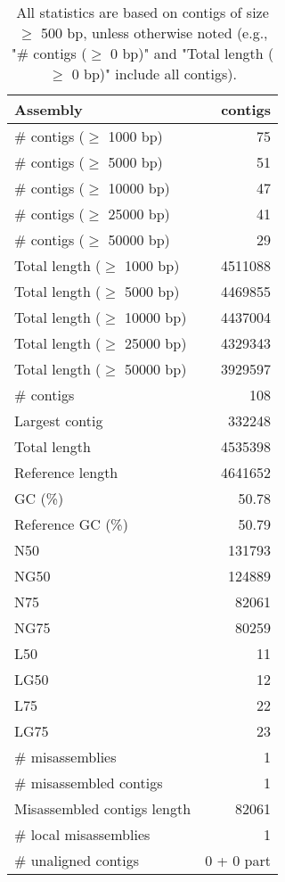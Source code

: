 \documentclass[12pt,a4paper]{article}
\begin{document}
\begin{table}[ht]
\begin{center}
\caption{All statistics are based on contigs of size $\geq$ 500 bp, unless otherwise noted (e.g., "\# contigs ($\geq$ 0 bp)" and "Total length ($\geq$ 0 bp)" include all contigs).}
\begin{tabular}{|l*{1}{|r}|}
\hline
Assembly & contigs \\ \hline
\# contigs ($\geq$ 1000 bp) & 75 \\ \hline
\# contigs ($\geq$ 5000 bp) & 51 \\ \hline
\# contigs ($\geq$ 10000 bp) & 47 \\ \hline
\# contigs ($\geq$ 25000 bp) & 41 \\ \hline
\# contigs ($\geq$ 50000 bp) & 29 \\ \hline
Total length ($\geq$ 1000 bp) & 4511088 \\ \hline
Total length ($\geq$ 5000 bp) & 4469855 \\ \hline
Total length ($\geq$ 10000 bp) & 4437004 \\ \hline
Total length ($\geq$ 25000 bp) & 4329343 \\ \hline
Total length ($\geq$ 50000 bp) & 3929597 \\ \hline
\# contigs & 108 \\ \hline
Largest contig & 332248 \\ \hline
Total length & 4535398 \\ \hline
Reference length & 4641652 \\ \hline
GC (\%) & 50.78 \\ \hline
Reference GC (\%) & 50.79 \\ \hline
N50 & 131793 \\ \hline
NG50 & 124889 \\ \hline
N75 & 82061 \\ \hline
NG75 & 80259 \\ \hline
L50 & 11 \\ \hline
LG50 & 12 \\ \hline
L75 & 22 \\ \hline
LG75 & 23 \\ \hline
\# misassemblies & 1 \\ \hline
\# misassembled contigs & 1 \\ \hline
Misassembled contigs length & 82061 \\ \hline
\# local misassemblies & 1 \\ \hline
\# unaligned contigs & 0 + 0 part \\ \hline

\end{tabular}
\end{center}
\end{table}
\end{document}
